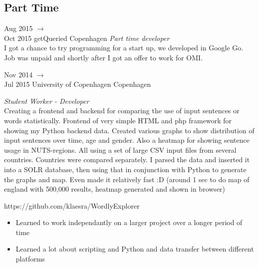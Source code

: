 \documentclass[]{friggeri-cv} %
\begin{document}
\begin{entrylist}

\end{entrylist}

\pagebreak

\subsection{Part Time}

\begin{entrylist}

\entry
{Aug 2015 $\rightarrow$ \\ Oct 2015}
{getQueried}
{Copenhagen}
{\emph{Part time developer} \\
I got a chance to try programming for a start up, we developed in Google Go. Job was unpaid and shortly after I got an offer to work for OMI.
}

\entry
{Nov 2014 $\rightarrow$ \\ Jul 2015 }
{University of Copenhagen}
{Copenhagen}
{\emph{Student Worker - Developer} \\
Creating a frontend and backend for comparing the use of input sentences or words statistically. 
Frontend of very simple HTML and php framework for showing my Python backend data.
Created various graphs to show distribution of input sentences over time, age and gender. 
Also a heatmap for showing sentence usage in NUTS-regions. All using a set of large CSV input files from several countries. 
Countries were compared separately. 
I parsed the data and inserted it into a SOLR database, then using that in conjunction with Python to generate the graphs and map. 
Even made it relatively fast :D (around 1 sec to do map of england with 500,000 results, heatmap generated and shown in browser)

https://github.com/klaesra/WordlyExplorer \\
\begin{itemize}
	\item Learned to work independantly on a larger project over a longer period of time
	\item Learned a lot about scripting and Python and data transfer between different platforms
\end{itemize}
}


\end{entrylist}

\end{document}
